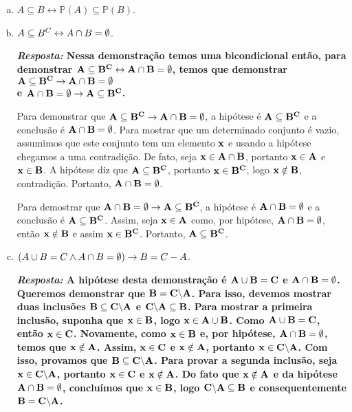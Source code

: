 \begin{enumerate}[{\bf 1.}]
\begin{enumerate}[a)]
{\bf{\it Resposta:} Primeiro mostremos que ${\bf A\subseteq B\to A\uni B=B}$. Seja ${\bf x\in B}$. Ent\ao ${\bf x\in A}$ ou ${\bf x\in B}$ assim ${\bf x\in A\uni B}$. Agora, seja ${\bf x\in A\uni B}$. Portanto, ${\bf x\in A}$ ou ${\bf x\in B}$. Se ${\bf x\in B}$ o teorema estar\'a pronto, portanto, suponha ${\bf x\in A}$. Como ${\bf A\subseteq B}$ temos ${\bf x\in B}$ e assim ${\bf A\uni B=B}$. Agora, mostremos que ${\bf A\uni B=B\to A\subseteq B}$. Seja ${\bf x\in A}$. Ent\ao ${\bf x\in A\uni B}$ e, portanto, ${\bf x\in B}$ pois ${\bf A\uni B=B}$.}

\item $A\subseteq B\leftrightarrow \mathbb{P}(A)\subseteq\mathbb{P}(B)$.
\item $A\subseteq B^C\leftrightarrow A\cap B=\emptyset$.

{\bf{\it Resposta:} Nessa demonstração temos uma bicondicional então, para demonstrar ${\bf A\subseteq B^C\leftrightarrow A\cap B=\emptyset}$, temos que demonstrar ${\bf A\subseteq B^C\to A\cap B=\emptyset}$ \\ e ${\bf A\cap B=\emptyset\to A\subseteq B^C}$.

Para demonstrar que ${\bf A\subseteq B^C\to A\cap B=\emptyset}$, a hipótese é ${\bf A\subseteq B^C}$ e a conclusão é ${\bf A\cap B=\emptyset}$. Para mostrar que um determinado conjunto é vazio, assumimos que este conjunto tem um elemento ${\bf x}$ e usando a hipótese chegamos a uma contradição. De fato, seja ${\bf x\in A\cap B}$, portanto ${\bf x\in A}$ e ${\bf x\in B}$. A hipótese diz que ${\bf A\subseteq B^C}$, portanto ${\bf x\in B^C}$, logo ${\bf x\notin B}$, contradição. Portanto, ${\bf A\cap B=\emptyset}$.

Para demostrar que ${\bf A\cap B=\emptyset\to A\subseteq B^C}$, a hipótese é ${\bf A\cap B=\emptyset}$ e a conclusão é ${\bf A\subseteq B^C}$. Assim, seja ${\bf x\in A}$ como, por hipótese, ${\bf A\cap B=\emptyset}$, então ${\bf x\notin B}$ e assim ${\bf x\in B^C}$. Portanto, ${\bf A\subseteq B^C}$. }

\item $(A\cup B=C\wedge A\cap B=\emptyset)\to B=C-A$.

{\bf{\it Resposta:} A hipótese desta demonstração é ${\bf A\cup B=C}$ e ${\bf A\cap B=\emptyset}$. Queremos demonstrar que ${\bf B=C\backslash A}$. Para isso, devemos mostrar duas inclusões ${\bf B\subseteq C\backslash A}$ e ${\bf C \backslash A\subseteq B}$. Para mostrar a primeira inclusão, suponha que ${\bf x\in B}$, logo ${\bf x\in A\uni B}$. Como ${\bf A\cup B=C}$, então ${\bf x\in C}$. Novamente, como ${\bf x\in B}$ e, por hipótese, ${\bf A\cap B=\emptyset}$, temos que ${\bf x\notin A}$. Assim, ${\bf x\in C}$ e ${\bf x\notin A}$, portanto ${\bf x\in C\backslash A}$. Com isso, provamos que ${\bf B\subseteq C\backslash A}$. Para provar a segunda inclusão, seja ${\bf x\in C\backslash A}$, portanto ${\bf x\in C}$ e ${\bf x\notin A}$. Do fato que ${\bf x\notin A}$ e da hipótese ${\bf A\cap B=\emptyset}$, concluímos que ${\bf x\in B}$, logo ${\bf C \backslash A\subseteq B}$ e consequentemente ${\bf B=C \backslash A}$.}


\end{enumerate}
\end{enumerate}
